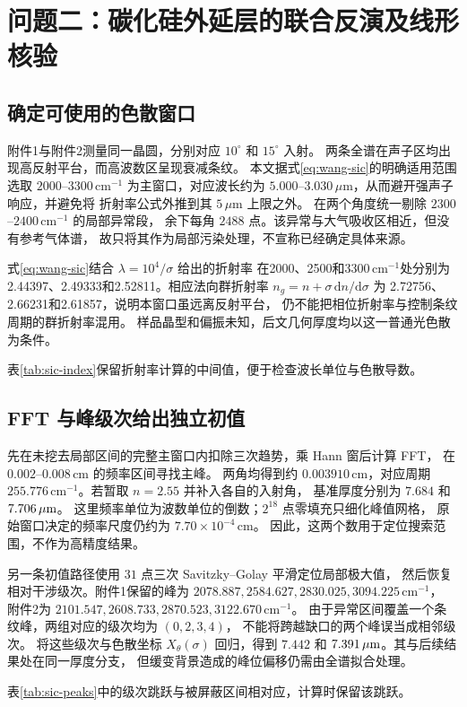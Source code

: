 \section{问题二：碳化硅外延层的联合反演及线形核验}
\label{sec:sic-results}

\subsection{确定可使用的色散窗口}
附件1与附件2测量同一晶圆，分别对应 $10^\circ$ 和 $15^\circ$ 入射。
两条全谱在声子区均出现高反射平台，而高波数区呈现衰减条纹。
本文据式\eqref{eq:wang-sic}的明确适用范围选取
$2000$--$3300\,\mathrm{cm}^{-1}$ 为主窗口，对应波长约为
$5.000$--$3.030\,\mu\mathrm m$，从而避开强声子响应，并避免将
折射率公式外推到其 $5\,\mu\mathrm m$ 上限之外\cite{Wang2013,Polyanskiy2024}。
在两个角度统一剔除 $2300$--$2400\,\mathrm{cm}^{-1}$ 的局部异常段，
余下每角 $2488$ 点。该异常与大气吸收区相近，但没有参考气体谱，
故只将其作为局部污染处理，不宣称已经确定具体来源。

式\eqref{eq:wang-sic}结合 $\lambda=10^4/\sigma$ 给出的折射率
在2000、2500和3300$\,\mathrm{cm}^{-1}$处分别为
2.44397、2.49333和2.52811。相应法向群折射率
$n_g=n+\sigma\,\mathrm{d}n/\mathrm{d}\sigma$ 为
2.72756、2.66231和2.61857，说明本窗口虽远离反射平台，
仍不能把相位折射率与控制条纹周期的群折射率混用。
样品晶型和偏振未知，后文几何厚度均以这一普通光色散为条件。

表\ref{tab:sic-index}保留折射率计算的中间值，便于检查波长单位与色散导数。

\subsection{FFT 与峰级次给出独立初值}
先在未挖去局部区间的完整主窗口内扣除三次趋势，乘 Hann 窗后计算 FFT，
在 $0.002$--$0.008\,\mathrm{cm}$ 的频率区间寻找主峰。
两角均得到约 $0.003910\,\mathrm{cm}$，对应周期
$255.776\,\mathrm{cm}^{-1}$。若暂取 $n=2.55$ 并补入各自的入射角，
基准厚度分别为 $7.684$ 和 $7.706\,\mu\mathrm{m}$。
这里频率单位为波数单位的倒数；$2^{18}$ 点零填充只细化峰值网格，
原始窗口决定的频率尺度仍约为 $7.70\times10^{-4}\,\mathrm{cm}$。
因此，这两个数用于定位搜索范围，不作为高精度结果。

另一条初值路径使用 $31$ 点三次 Savitzky--Golay 平滑定位局部极大值\cite{SavitzkyGolay1964}，
然后恢复相对干涉级次。附件1保留的峰为
$2078.887,2584.627,2830.025,3094.225\,\mathrm{cm}^{-1}$，
附件2为 $2101.547,2608.733,2870.523,3122.670\,\mathrm{cm}^{-1}$。
由于异常区间覆盖一个条纹峰，两组对应的级次均为 $(0,2,3,4)$，
不能将跨越缺口的两个峰误当成相邻级次。
将这些级次与色散坐标 $X_\theta(\sigma)$ 回归，得到
$7.442$ 和 $7.391\,\mu\mathrm{m}$。其与后续结果处在同一厚度分支，
但缓变背景造成的峰位偏移仍需由全谱拟合处理。

表\ref{tab:sic-peaks}中的级次跳跃与被屏蔽区间相对应，计算时保留该跳跃。

